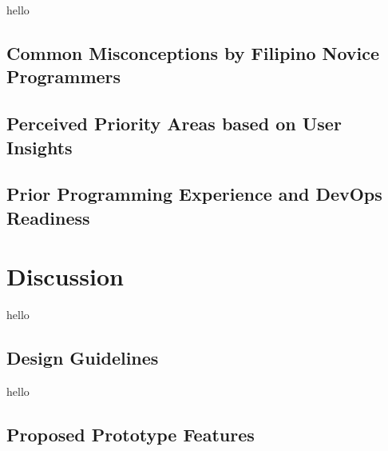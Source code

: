 \documentclass{sigchi}
\begin{document}

hello

\subsection{Common Misconceptions by Filipino Novice Programmers}
\subsection{Perceived Priority Areas based on User Insights}
\subsection{Prior Programming Experience and DevOps Readiness}

\section{Discussion}
hello
\subsection{Design Guidelines}
hello
\subsection{Proposed Prototype Features}
\end{document}
